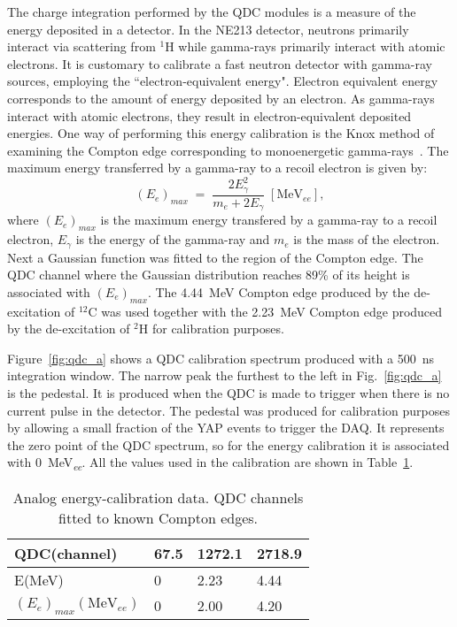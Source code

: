 \documentclass[main.tex]{subfiles}
\begin{document}
The charge integration performed by the QDC modules is a measure of the energy deposited in a detector. In the NE213 detector, neutrons primarily interact via scattering from $^1$H while gamma-rays primarily interact with atomic electrons. It is customary to calibrate a fast neutron detector with gamma-ray sources, employing the ``electron-equivalent energy". Electron equivalent energy corresponds to the amount of energy deposited by an electron. As gamma-rays interact with atomic electrons, they result in electron-equivalent deposited energies. One way of performing this energy calibration is the Knox method of examining the Compton edge corresponding to monoenergetic gamma-rays~\cite{Nilsson}. The maximum energy transferred by a gamma-ray to a recoil electron is given by:
\begin{equation}
	(E_{e})_{max}\;=\;\frac{2E_{\gamma}^2}{m_e + 2E_\gamma} \;[\textrm{MeV}_{ee}],
\end{equation}
where $(E_e)_{max}$ is the maximum energy transfered by a gamma-ray to a recoil electron, $E_\gamma$ is the energy of the gamma-ray and $m_e$ is the mass of the electron.
Next a Gaussian function was fitted to the region of the Compton edge. The QDC channel where the Gaussian distribution reaches 89\% of its height is associated with $(E_e)_{max}$. The \SI{4.44}{MeV} Compton edge produced by the de-excitation of $^{12}$C was used together with the \SI{2.23}{MeV} Compton edge produced by the de-excitation of $^2$H for calibration purposes.

Figure~\ref{fig:qdc_a} shows a QDC calibration spectrum produced with a \SI{500}{ns} integration window. The narrow peak the furthest to the left in Fig.~\ref{fig:qdc_a} is the pedestal. It is produced when the QDC is made to trigger when there is no current pulse in the detector. The pedestal was produced for calibration purposes by allowing a small fraction of the YAP events to trigger the DAQ. It represents the zero point of the QDC spectrum, so for the energy calibration it is associated with \SI{0}{MeV_{\textit{ee}}}. All the values used in the calibration are shown in Table~\ref{tab:knox_a}.

\begin{table}[hb]
	\center
	\begin{tabular}{|l|l|l|l|}
	\hline
	QDC(channel)             & 67.5 & 1272.1 & 2718.9 \\
	\hline
	E(MeV)          & 0    & 2.23  & 4.44 \\
	\hline
	$(E_{e})_{max}(\textrm{MeV}_{ee})$ & 0    & 2.00  & 4.20 \\
	\hline
	\end{tabular}
   	\captionsetup{width=0.435\linewidth}
	\caption[Analog energy-calibration data.]{Analog energy-calibration data. QDC channels fitted to known Compton edges.}
	\label{tab:knox_a}
\end{table}
\end{document}
